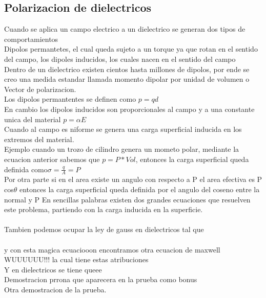\subsection {Polarizacion de dielectricos}
Cuando se aplica un campo electrico a un dielectrico se generan dos tipos de comportamientos \\
Dipolos permantetes, el cual queda sujeto a un torque ya que rotan en el sentido del campo,  los dipoles inducidos, los cuales nacen en el sentido del campo\\
Dentro de un dielectrico existen cientos hasta millones de dipolos, por ende se creo una medida estandar llamada momento dipolar por unidad de volumen o Vector de polarizacion.\\
Los dipolos permantentes se definen como $p=q d$\\
En cambio los dipolos inducidos son proporcionales al campo y a una constante unica del material $p=\alpha E$\\
Cuando al campo es niforme se genera una carga superficial inducida en los extremos del material. \\
Ejemplo cuando un trozo de cilindro genera un mometo polar, mediante la ecuacion anterior sabemos que $p= P*Vol$, entonces la carga superficial queda definida como$\sigma = \frac{q}{A} =P$\\
Por otra parte si en el area existe un angulo con respecto a P el area efectiva es P cos$\theta $ entonces la carga superficial queda definida por el angulo del coseno entre la normal y P
En sencillas palabras existen dos grandes ecuaciones que resuelven este problema, partiendo con la carga inducida en la superficie.\\
\\
Tambien podemos ocupar la ley de gauss en dielectricos tal que
\\
\\ y con esta magica ecuaciooon encontramos otra ecuacion de maxwell WUUUUUU!!!
la cual tiene estas atribuciones 
\\
Y en dielectricos se tiene queee
\\
Demostracion prrona que aparecera en la prueba como bonus 
\\
Otra demostracion de la prueba.

